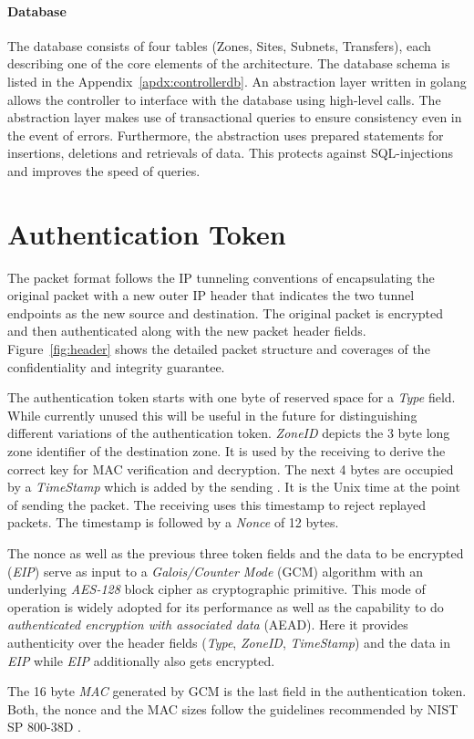 \paragraph{Database}
The database consists of four tables (Zones, Sites, Subnets, Transfers), each describing one of 
the core elements of the architecture.
The database schema is listed in the Appendix~\ref{apdx:controllerdb}. An abstraction layer 
written in golang allows the controller to interface with the database using high-level calls. 
The abstraction layer makes use of transactional queries to ensure consistency even in the event 
of errors. Furthermore, the abstraction uses prepared statements for insertions, deletions and 
retrievals of data. This protects against SQL-injections and improves the speed of queries. 


\section{Authentication Token}
\label{sec:token}

The \name packet format follows the IP tunneling conventions of encapsulating the original 
packet with a new outer IP header that indicates the two tunnel endpoints as the new source 
and destination. The original packet is encrypted and then authenticated along with the new
packet header fields. Figure~\ref{fig:header} shows the detailed packet structure and coverages 
of the confidentiality and integrity guarantee. 

The authentication token starts with one byte of reserved space for a \textit{Type} field. While 
currently unused this will be useful in the future for distinguishing different variations of 
the authentication token. \textit{ZoneID} depicts the 3 byte long zone identifier of the 
destination zone. It is used by the receiving \tp to derive the correct key for MAC verification 
and decryption. The next 4 bytes are occupied by a \textit{TimeStamp} which is added by the 
sending \tp. It is the Unix time at the point of sending the packet. The receiving \tp uses this 
timestamp to reject replayed packets. The timestamp is followed by a \textit{Nonce} of 12 bytes.

The nonce as well as the previous three token fields and the data to be encrypted (\textit{EIP}) 
serve as input to a \textit{Galois/Counter Mode} (GCM) algorithm with an underlying 
\textit{AES-128} block cipher as cryptographic primitive. This mode of operation is widely 
adopted for its performance as well as the capability to do \textit{authenticated encryption 
with associated data} (AEAD). Here it provides authenticity over the header fields 
(\textit{Type}, \textit{ZoneID}, \textit{TimeStamp}) and the data in \textit{EIP} while 
\textit{EIP} additionally also gets encrypted.

The 16 byte \textit{MAC} generated by GCM is the last field in the authentication token. Both, 
the nonce and the MAC sizes follow the guidelines recommended by NIST SP 800-38D \cite{nistgcm}.

